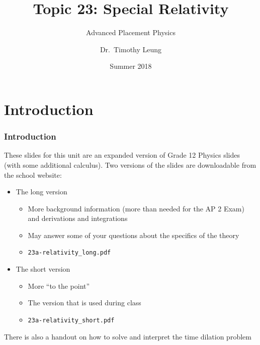 \documentclass[12pt,compress,aspectratio=169]{beamer}
\title{Topic 23: Special Relativity}
\subtitle{Advanced Placement Physics}
\author[TML]{Dr.\ Timothy Leung}
\institute{Olympiads School}
\date{Summer 2018}
\begin{document}
\begin{frame}
  \maketitle
\end{frame}



\section[Intro]{Introduction}
\begin{frame}
  \frametitle{Introduction}
  These slides for this unit are an expanded version of Grade 12 Physics slides
  (with some additional calculus). Two versions of the slides are downloadable
  from the school website:
  \begin{itemize}
  \item The long version
    \begin{itemize}
    \item More background information (more than needed for the AP 2 Exam) and
      derivations and integrations
    \item May answer some of your questions about the specifics of the theory
    \item \texttt{23a-relativity\_long.pdf}
    \end{itemize}
  \item<alert@1> The short version
    \begin{itemize}
    \item More ``to the point''
    \item The version that is used during class
    \item \texttt{23a-relativity\_short.pdf}
    \end{itemize}
  \end{itemize}
  There is also a handout on how to solve and interpret the time dilation
  problem
\end{frame}
\end{document}
